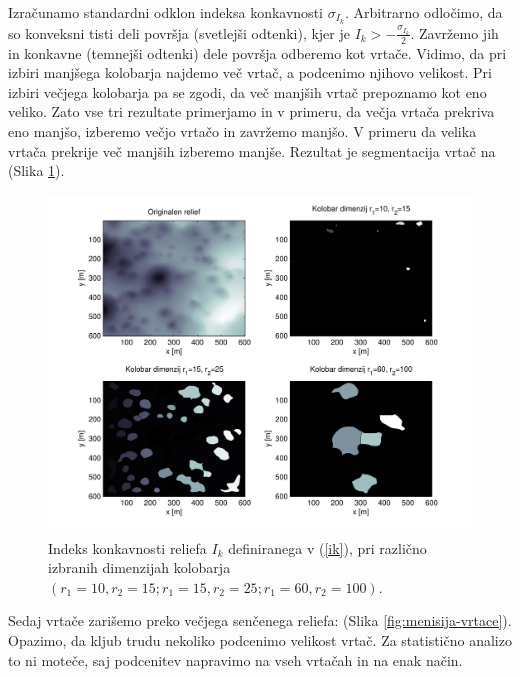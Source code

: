 \documentclass[a4paper, twoside, 12pt]{book}
\begin{document}
Izračunamo standardni odklon indeksa konkavnosti $\sigma_{I_k}$. Arbitrarno odločimo, da so konveksni tisti deli površja (svetlejši odtenki), kjer je $I_k > -\frac{\sigma_{I_k}}{2}$. Zavržemo jih in konkavne (temnejši odtenki) dele površja odberemo kot vrtače. Vidimo, da pri izbiri manjšega kolobarja najdemo več vrtač, a podcenimo njihovo velikost. Pri izbiri večjega kolobarja pa se zgodi, da več manjših vrtač prepoznamo kot eno veliko. Zato vse tri rezultate primerjamo in v primeru, da večja vrtača prekriva eno manjšo, izberemo večjo vrtačo in zavržemo manjšo. V primeru da velika vrtača prekrije več manjših izberemo manjše. Rezultat je segmentacija vrtač na (Slika \ref{fig:concavity-segmentation-samples}).
  \begin{figure}[h!]
    \begin{center}
      \includegraphics[width=12cm]{slike/concavity-segmentation-samples.pdf}
    \end{center}
    \caption{Indeks konkavnosti reliefa $I_k$ definiranega v (\ref{ik}), pri različno izbranih dimenzijah kolobarja $(r_1=10,r_2=15;r_1=15,r_2=25;r_1=60,r_2=100)$.}
    \label{fig:concavity-segmentation-samples}
  \end{figure}
Sedaj vrtače zarišemo preko večjega senčenega reliefa: (Slika \ref{fig:menisija-vrtace}). Opazimo, da kljub trudu nekoliko podcenimo velikost vrtač. Za statistično analizo to ni moteče, saj podcenitev napravimo na vseh vrtačah in na enak način.
\end{document}
